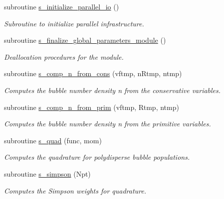 \begin{DoxyCompactItemize}
subroutine \hyperlink{namespacem__global__parameters_a54905a7a2ce9e15fc33ebac52c0d3c27}{s\+\_\+initialize\+\_\+parallel\+\_\+io} ()
\begin{DoxyCompactList}\small\item\em Subroutine to initialize parallel infrastructure. \end{DoxyCompactList}\item 
subroutine \hyperlink{namespacem__global__parameters_aa2237c2ed3662bbd69ef39e2e92af7bf}{s\+\_\+finalize\+\_\+global\+\_\+parameters\+\_\+module} ()
\begin{DoxyCompactList}\small\item\em Deallocation procedures for the module. \end{DoxyCompactList}\item 
subroutine \hyperlink{namespacem__global__parameters_aac1a5a73b1eae759c913983b38047167}{s\+\_\+comp\+\_\+n\+\_\+from\+\_\+cons} (vftmp, n\+Rtmp, ntmp)
\begin{DoxyCompactList}\small\item\em Computes the bubble number density n from the conservative variables. \end{DoxyCompactList}\item 
subroutine \hyperlink{namespacem__global__parameters_acdaa3827df6fee38a3e55e8b13130c27}{s\+\_\+comp\+\_\+n\+\_\+from\+\_\+prim} (vftmp, Rtmp, ntmp)
\begin{DoxyCompactList}\small\item\em Computes the bubble number density n from the primitive variables. \end{DoxyCompactList}\item 
subroutine \hyperlink{namespacem__global__parameters_aa5a48fa9cc196136634022cfa6708213}{s\+\_\+quad} (func, mom)
\begin{DoxyCompactList}\small\item\em Computes the quadrature for polydisperse bubble populations. \end{DoxyCompactList}\item 
subroutine \hyperlink{namespacem__global__parameters_a78f4bf8bb59af4396bf11aca330463ec}{s\+\_\+simpson} (Npt)
\begin{DoxyCompactList}\small\item\em Computes the Simpson weights for quadrature. \end{DoxyCompactList}\end{DoxyCompactItemize}
